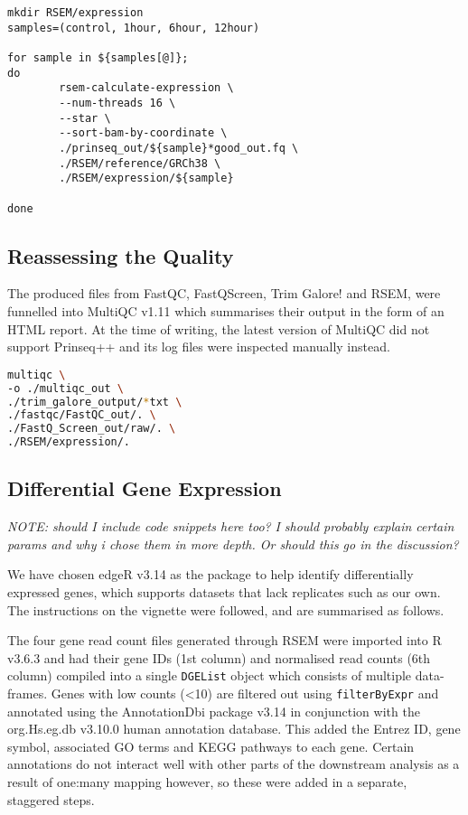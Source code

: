 \begin{lstlisting}[caption=RSEM expression command, label={lst:RSEM_exp}]
mkdir RSEM/expression
samples=(control, 1hour, 6hour, 12hour)

for sample in ${samples[@]};
do
        rsem-calculate-expression \
        --num-threads 16 \
        --star \
        --sort-bam-by-coordinate \
        ./prinseq_out/${sample}*good_out.fq \
        ./RSEM/reference/GRCh38 \
        ./RSEM/expression/${sample}

done
\end{lstlisting}

\subsection{Reassessing the Quality}

The produced files from FastQC, FastQScreen, Trim Galore! and RSEM, were funnelled into MultiQC v1.11 \citep{multiqc} which summarises their output in the form of an HTML report. At the time of writing, the latest version of MultiQC did not support Prinseq++ and its log files were inspected manually instead.

\begin{lstlisting}[language=bash, caption=MultiQC command]
multiqc \
-o ./multiqc_out \
./trim_galore_output/*txt \
./fastqc/FastQC_out/. \
./FastQ_Screen_out/raw/. \
./RSEM/expression/.
\end{lstlisting}

\subsection{Differential Gene Expression}
\emph{NOTE: should I include code snippets here too?}
\emph{I should probably explain certain params and why i chose them in more depth. Or should this go in the discussion?}

We have chosen edgeR v3.14 \citep{edger} as the package to help identify differentially expressed genes, which supports datasets that lack replicates such as our own. The instructions on the vignette were followed, and are summarised as follows. 

The four gene read count files generated through RSEM were imported into R v3.6.3 \citep{R} and had their gene IDs (1st column) and normalised read counts (6th column) compiled into a single \texttt{DGEList} object which consists of multiple data-frames. Genes with low counts (<10) are filtered out using \texttt{filterByExpr} and annotated using the AnnotationDbi package v3.14 \citep{annotationdbi} in conjunction with the org.Hs.eg.db v3.10.0 \citep{org.Hs.eg.db} human annotation database. This added the Entrez ID, gene symbol, associated GO terms and KEGG pathways to each gene. Certain annotations do not interact well with other parts of the downstream analysis as a result of one:many mapping however, so these were added in a separate, staggered steps.

